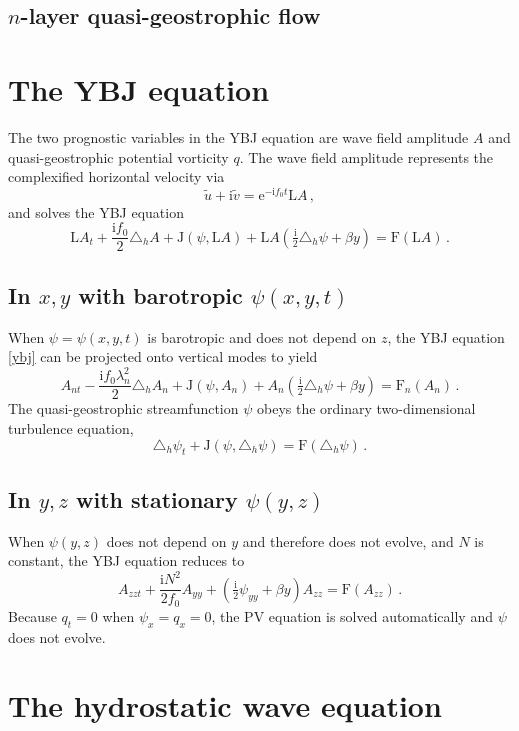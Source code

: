 \documentclass[12pt, oneside]{article}
\newcommand{\com}{\, ,}
\newcommand{\per}{\, .}
\newcommand{\beq}{\begin{equation}}
\newcommand{\eeq}{\end{equation}}
\newcommand{\hlap}{\triangle_h}
\newcommand{\ee}{\mathrm{e}}
\newcommand{\ii}{\mathrm{i}}
\newcommand{\J}{\mathrm{J}}
\renewcommand{\L}{\mathrm{L}}
\newcommand{\friction}{\mathrm{F}}
\begin{document}
\subsection{$n$-layer quasi-geostrophic flow}

\section{The YBJ equation}

The two prognostic variables in the YBJ equation are wave field amplitude $A$ and quasi-geostrophic potential vorticity $q$. The wave field amplitude represents the complexified horizontal velocity via
\beq
\tilde u + \ii \tilde v = \ee^{- \ii f_0 t} \L A \com
\eeq
and solves the YBJ equation
\beq
\L A_t + \frac{\ii f_0}{2} \hlap A +  \J \left ( \psi, \L A \right ) + \L A \left ( \tfrac{\ii}{2} \hlap \psi + \beta y \right ) = \friction \left ( \L A \right ) \per
\label{ybj}
\eeq

\subsection{In $x,y$ with barotropic $\psi(x, y, t)$}

When $\psi = \psi(x, y, t)$ is barotropic and does not depend on $z$, the YBJ equation \eqref{ybj} can be projected onto vertical modes to yield
\beq
A_{nt} - \frac{\ii f_0 \lambda_n^2}{2} \hlap A_n + \J \left ( \psi, A_n \right ) + A_n \left ( \tfrac{\ii}{2} \hlap \psi + \beta y \right ) = \friction_{n} \left ( A_n \right ) \per
\eeq
The quasi-geostrophic streamfunction $\psi$ obeys the ordinary two-dimensional turbulence equation, 
\beq
\hlap \psi_t + \J \left ( \psi, \hlap \psi \right ) = \friction \left ( \hlap \psi \right ) \per
\eeq

\subsection{In $y, z$ with stationary $\psi(y, z)$}

When $\psi(y, z)$ does not depend on $y$ and therefore does not evolve, and $N$ is constant, the YBJ equation reduces to
\beq
A_{zzt} + \frac{\ii N^2}{2 f_0} A_{yy} + \left ( \tfrac{\ii}{2} \psi_{yy} + \beta y \right ) A_{zz} = \friction \left ( A_{zz} \right ) \per
\eeq
Because $q_t = 0$ when $\psi_x = q_x = 0$, the PV equation is solved automatically and $\psi$ does not evolve.

\section{The hydrostatic wave equation}
\end{document}
